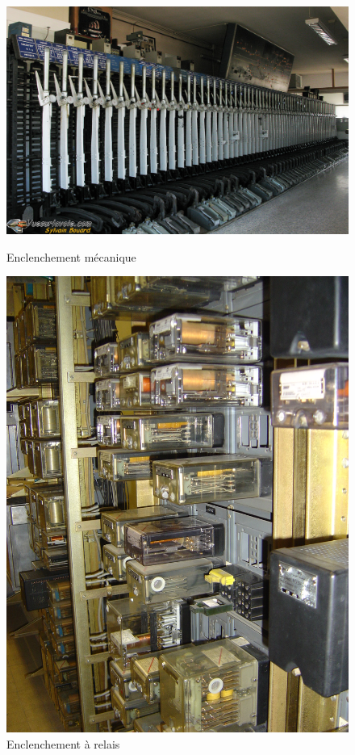 \begin{figure}[ht]
    \begin{minipage}[c]{.46\linewidth}
        \centering
        \includegraphics[scale=0.3]{enclenchement_mecanique.jpg}
        \caption{Enclenchement mécanique}
        \label{clenche}
    \end{minipage}
    \hfill%
    \begin{minipage}[c]{.46\linewidth}
        \centering
        \includegraphics[scale=0.075]{enclenchement_relais.jpg}
        \caption{Enclenchement à relais}
        \label{relais}
    \end{minipage}
\end{figure}


